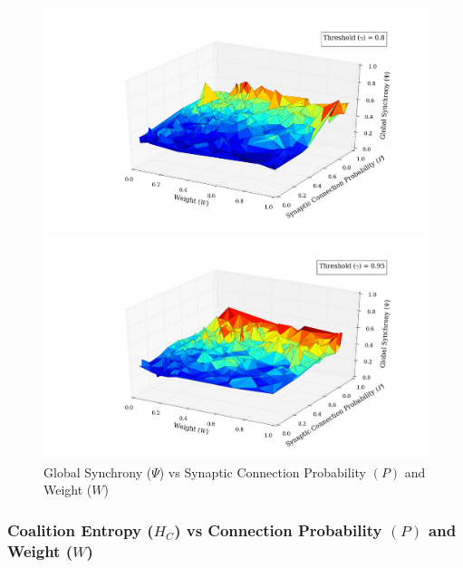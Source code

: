 \documentclass[a4paper,11pt]{article}
\begin{document}
\begin{figure}[H] 
	\begin{minipage}[b]{0.5\linewidth}
		\begin{center}
		\includegraphics[scale = 0.2]{figures/snn/p_w_psi_8_1}
		\end{center}
		\vspace{4ex}
	\end{minipage}
	\begin{minipage}[b]{0.5\linewidth}
		\begin{center}
		\includegraphics[scale = 0.2]{figures/snn/p_w_psi_95_1}
		\end{center}
		\vspace{4ex}
	\end{minipage}
	\caption{
			Global Synchrony ($\Psi$) vs Synaptic Connection Probability $(P)$ and Weight ($W$)
			\label{fig:p_w_psi_all}
		}
\end{figure}

\subsubsection{Coalition Entropy ($H_C$) vs Connection Probability $(P)$ and Weight ($W$)}
\label{sec:app:snn:res:hc}
\end{document}
